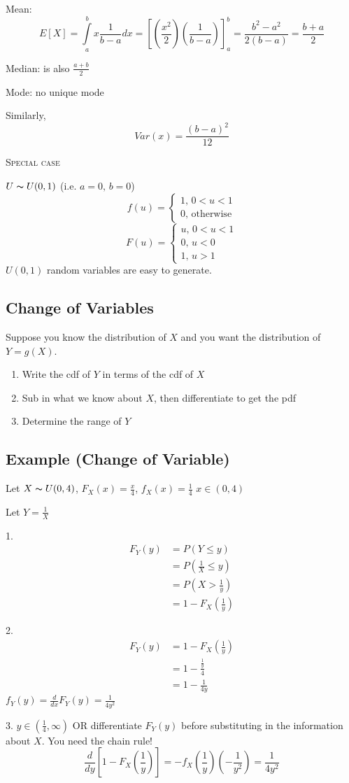 Mean:
\[ E[X]=\int\limits_{a}^{b} x \frac{1}{b-a} d{x}
=\left[\left(\frac{x^2}{2}\right)\left(\frac{1}{b-a}\right)\right]_a^b
=\frac{b^2-a^2}{2(b-a)}=\frac{b+a}{2} \]

Median: is also $ \frac{a+b}{2} $

Mode: no unique mode

Similarly,
\[ Var(x)=\frac{(b-a)^2}{12} \]

\textsc{Special case}

$ U \thicksim U(0,1) $ (i.e. $ a=0,\,b=0 $)
\[ f(u)=
\begin{cases}
    1,\,0<u<1\\
    0,\,\text{otherwise}
\end{cases} \]
\[ F(u)=
\begin{cases}
    u,\,0<u<1\\
    0,\,u<0\\
    1,\,u>1
\end{cases} \]
$ U(0,1) $ random variables are easy to generate.

\subsection{Change of Variables}
Suppose you know the distribution of $ X $ and you want the distribution of
$ Y=g(X) $.
\begin{enumerate}[1.]
    \item Write the cdf of $ Y $ in terms of the cdf of $ X $
    \item Sub in what we know about $ X $, then differentiate to get the pdf
    \item Determine the range of $ Y $
\end{enumerate}
\subsection{Example (Change of Variable)}
Let $ X \thicksim U(0,4) $, $ F_X(x)=\frac{x}{4} $, $ f_X(x)=\frac{1}{4} $ 
$ x\in(0,4) $

Let $ Y=\frac{1}{X} $

1.
\begin{align*}
    F_Y(y)&=P\left(Y\le y\right)\\
    &=P\left(\frac{1}{X} \le y\right)\\
    &=P\left(X>\frac{1}{y}\right)\\
    &=1-F_X\left(\frac{1}{y}\right)
\end{align*}

2.
\begin{align*}
    F_Y(y)&=1-F_X\left(\frac{1}{y}\right)\\
    &=1-\frac{\frac{1}{y}}{4}\\
    &=1-\frac{1}{4y}
\end{align*}
$ f_Y(y)=\frac{d}{dx}F_Y(y)=\frac{1}{4y^2} $

3. $ y\in(\frac{1}{4},\infty) $ OR differentiate $ F_Y(y) $ before
substituting in the information about $ X $. You need the chain rule!
\[ \frac{d}{dy}\left[1-F_X\left(\frac{1}{y}\right)\right]=
-f_X\left(\frac{1}{y}\right)\left(-\frac{1}{y^2}\right)=\frac{1}{4y^2} \]
